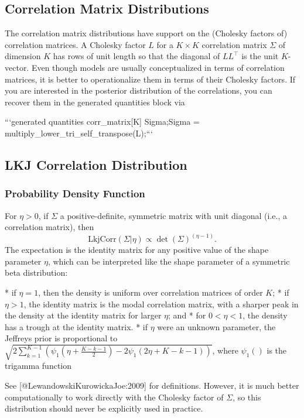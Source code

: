 \begin{description}
{\begin{description}
\chapter{Correlation Matrix Distributions}


The correlation matrix distributions have support on the (Cholesky factors of) correlation matrices.  A Cholesky factor $L$ for a $K \times K$ correlation matrix $\Sigma$ of dimension $K$ has rows of unit length so that the diagonal of $L L^{\top}$ is the unit $K$-vector. Even though models are usually conceptualized in terms of correlation matrices, it is better to operationalize them in terms of their Cholesky factors. If you are interested in the posterior distribution of the correlations, you can recover them in the generated quantities block via


```\n generated quantities {\n   corr_matrix[K] Sigma;\n   Sigma = multiply_lower_tri_self_transpose(L);\n }\n ```


\section{LKJ Correlation Distribution}\label{lkj-correlation.section}


\subsection{Probability Density Function}


For $\eta > 0$, if $\Sigma$ a positive-definite, symmetric matrix with unit diagonal (i.e., a correlation matrix), then \[ \text{LkjCorr}(\Sigma|\eta) \propto \det \left( \Sigma \right)^{(\eta - 1)}. \] The expectation is the identity matrix for any positive value of the shape parameter $\eta$, which can be interpreted like the shape parameter of a symmetric beta distribution:


*   if $\eta = 1$, then the density is uniform over correlation   matrices of order $K$; 
*   if $\eta > 1$, the identity matrix is the modal correlation   matrix, with a sharper peak in the density at the identity matrix   for larger $\eta$; and 
*   for $0 < \eta < 1$, the density has a trough at the identity   matrix. 
*   if $\eta$ were an unknown parameter, the Jeffreys prior is   proportional to $\sqrt{2\sum_{k=1}^{K-1}\left(   \psi_1\left(\eta+\frac{K-k-1}{2}\right) -   2\psi_1\left(2\eta+K-k-1 \right)\right)}$, where $\psi_1()$ is the   trigamma function


See [@LewandowskiKurowickaJoe:2009] for definitions. However, it is much better computationally to work directly with the Cholesky factor of $\Sigma$, so this distribution should never be explicitly used in practice.



\end{description}}
\end{description}
